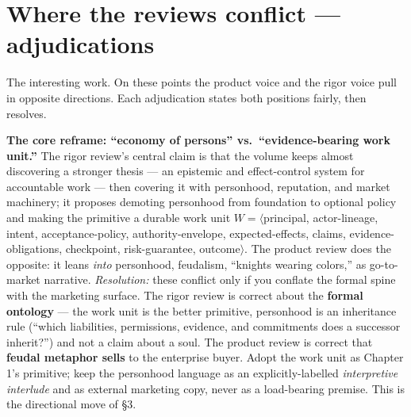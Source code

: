 \documentclass[11pt,a4paper]{article}
\begin{document}
\section{Where the reviews conflict --- adjudications}
The interesting work. On these points the product voice and the rigor voice pull in opposite directions. Each adjudication states both positions fairly, then resolves.

\begin{adj}\textbf{The core reframe: ``economy of persons'' vs.\ ``evidence-bearing work unit.''} The rigor review's central claim is that the volume keeps almost discovering a stronger thesis --- an epistemic and effect-control system for accountable work --- then covering it with personhood, reputation, and market machinery; it proposes demoting personhood from foundation to optional policy and making the primitive a durable work unit $W = \langle$principal, actor-lineage, intent, acceptance-policy, authority-envelope, expected-effects, claims, evidence-obligations, checkpoint, risk-guarantee, outcome$\rangle$. The product review does the opposite: it leans \emph{into} personhood, feudalism, ``knights wearing colors,'' as go-to-market narrative. \emph{Resolution:} these conflict only if you conflate the formal spine with the marketing surface. The rigor review is correct about the \textbf{formal ontology} --- the work unit is the better primitive, personhood is an inheritance rule (``which liabilities, permissions, evidence, and commitments does a successor inherit?'') and not a claim about a soul. The product review is correct that \textbf{feudal metaphor sells} to the enterprise buyer. Adopt the work unit as Chapter 1's primitive; keep the personhood language as an explicitly-labelled \emph{interpretive interlude} and as external marketing copy, never as a load-bearing premise. This is the directional move of \S3.
\end{adj}
\end{document}
